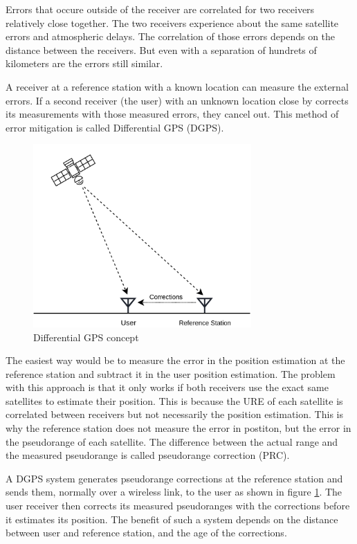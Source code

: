 Errors that occure outside of the receiver are correlated for two receivers relatively close together.
The two receivers experience about the same satellite errors and atmospheric delays.
The correlation of those errors depends on the distance between the receivers.
But even with a separation of hundrets of kilometers are the errors still similar.

A receiver at a reference station with a known location can measure the external errors.
If a second receiver (the user) with an unknown location close by corrects its measurements with those measured errors, they cancel out.
This method of error mitigation is called Differential GPS (DGPS).

\begin{figure}[ht]
 \centering
 \includegraphics[height=7cm]{images/Differential_GPS.png}
 \caption{Differential GPS concept}
 \label{fig:dgps}
\end{figure}

The easiest way would be to measure the error in the position estimation at the reference station and subtract it in the user position estimation.
The problem with this approach is that it only works if both receivers use the exact same satellites to estimate their position.
This is because the URE of each satellite is correlated between receivers but not necessarily the position estimation.
This is why the reference station does not measure the error in postiton, but the error in the pseudorange of each satellite.
The difference between the actual range and the measured pseudorange is called pseudorange correction (PRC).

A DGPS system generates pseudorange corrections at the reference station and sends them, normally over a wireless link, to the user as shown in figure \ref{fig:dgps}.
The user receiver then corrects its measured pseudoranges with the corrections before it estimates its position.
The benefit of such a system depends on the distance between user and reference station, and the age of the corrections.

